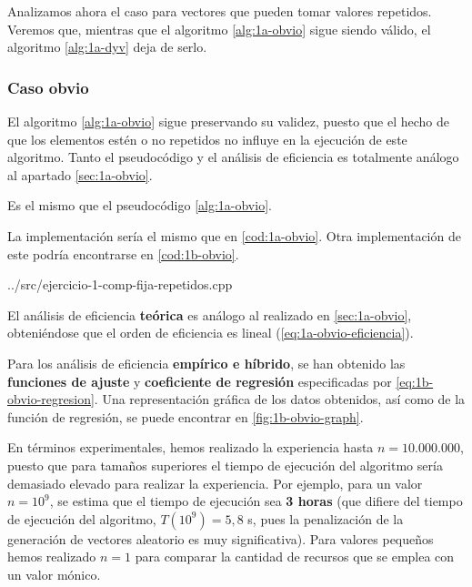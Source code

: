 Analizamos ahora el caso para vectores que pueden tomar valores repetidos. Veremos que, mientras que el algoritmo
\ref{alg:1a-obvio} sigue siendo válido, el algoritmo \ref{alg:1a-dyv} deja de serlo. 

\subsubsection{Caso obvio}

El algoritmo \ref{alg:1a-obvio} sigue preservando su validez, puesto que el hecho de que los elementos estén o no
repetidos no influye en la ejecución de este algoritmo. Tanto el pseudocódigo y el análisis de eficiencia es totalmente
análogo al apartado \ref{sec:1a-obvio}. 


Es el mismo que el pseudocódigo \ref{alg:1a-obvio}. 


La implementación sería el mismo que en \ref{cod:1a-obvio}. Otra implementación de este podría encontrarse en \ref{cod:1b-obvio}. 


{../src/ejercicio-1-comp-fija-repetidos.cpp} 


El análisis de eficiencia \textbf{teórica} es análogo al realizado en \ref{sec:1a-obvio}, obteniéndose 
que el orden de eficiencia es lineal (\ref{eq:1a-obvio-eficiencia}). 

Para los análisis de eficiencia \textbf{empírico e híbrido}, se han obtenido las \textbf{funciones de ajuste}
y \textbf{coeficiente de regresión} especificadas por \ref{eq:1b-obvio-regresion}. Una representación
gráfica de los datos obtenidos, así como de la función de regresión, se puede encontrar en \ref{fig:1b-obvio-graph}. 

En términos experimentales, hemos realizado la experiencia hasta $n=10.000.000$, puesto que para tamaños superiores
el tiempo de ejecución del algoritmo sería demasiado elevado para realizar la experiencia. Por ejemplo, para un valor
$n=10^9$, se estima que el tiempo de ejecución sea \textbf{3 horas} (que difiere del tiempo de ejecución del algoritmo,
$T(10^9) = 5,8$ s, pues la penalización de la generación de vectores aleatorio es muy significativa). 
Para valores pequeños hemos realizado $n=1$ para comparar la cantidad de recursos que se emplea con un valor mónico. 

